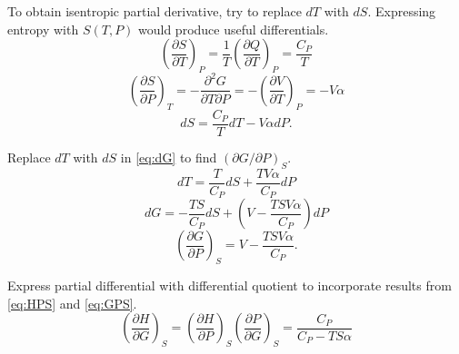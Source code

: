 \begin{@empty}
\begin{answer}
    To obtain isentropic partial derivative, try to replace $dT$ with $dS$.
    Expressing entropy with $S(T, P)$ would produce useful differentials.
    \[
        \left( \frac{\partial S}{\partial T} \right)_P
        = \frac1T \left( \frac{\partial Q}{\partial T} \right)_P
        = \frac{C_P}{T}
    \]
    \[
        \left( \frac{\partial S}{\partial P} \right)_T
        = -\frac{\partial^2 G}{\partial T \partial P}
        = -\left( \frac{\partial V}{\partial T} \right)_P
        = -V \alpha
    \]
    \[ dS = \frac{C_P}{T} dT - V \alpha dP. \]

    Replace $dT$ with $dS$ in \eqref{eq:dG} to find
    $\left( \partial G / \partial P \right)_S$.
    \[ dT = \frac{T}{C_P} dS + \frac{TV\alpha}{C_P} dP \]
    \[ dG = -\frac{TS}{C_P} dS + \left( V - \frac{TSV\alpha}{C_P} \right) dP \]
    \begin{equation}
        \left( \frac{\partial G}{\partial P} \right)_S = V - \frac{TSV\alpha}{C_P}. \label{eq:GPS}
    \end{equation}

    Express partial differential with differential quotient to incorporate
    results from \eqref{eq:HPS} and \eqref{eq:GPS}.
    \[
        \left( \frac{\partial H}{\partial G} \right)_S
        = \left( \frac{\partial H}{\partial P} \right)_S \left( \frac{\partial P}{\partial G} \right)_S
        = \frac{C_P}{C_P - TS\alpha}
    \]
\end{answer}
\end{@empty}
